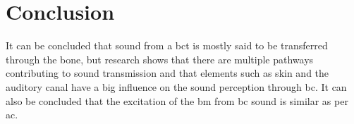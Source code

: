 \section{Conclusion}

It can be concluded that sound from a \gls{bct} is mostly said to be transferred through the bone, but research shows that there are multiple pathways contributing to sound transmission and that elements such as skin and the auditory canal have a big influence on the sound perception through \gls{bc}. %
It can also be concluded that the excitation of the \gls{bm} from \gls{bc} sound is similar as per \gls{ac}. %



